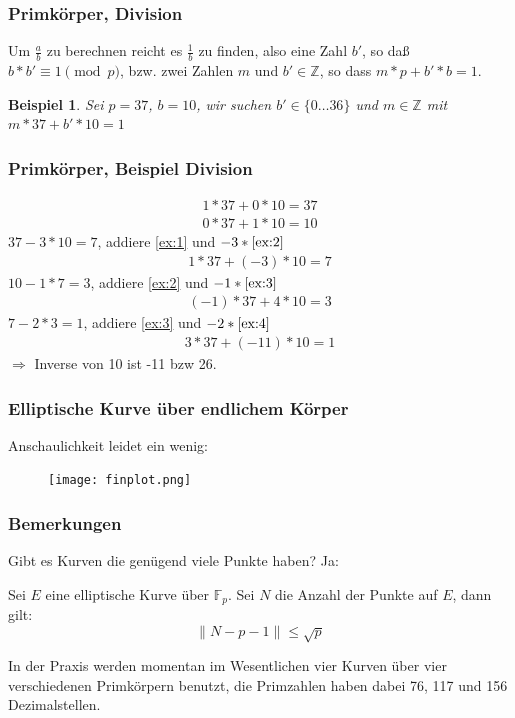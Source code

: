 \documentclass{beamer}
\newcommand{\F}{\mathbb{F}}
\newcommand{\Z}{\mathbb{Z}}
\newtheorem{beispiel}[theorem]{Beispiel}
\begin{document}
\begin{frame}
  \frametitle{Primkörper, Division}
  Um $\frac{a}{b}$ zu berechnen reicht es $\frac 1 b$ zu finden, also eine Zahl
  $b'$, so daß $b * b' \equiv 1 \pmod p$, bzw. zwei Zahlen $m$ und
  $b' \in \Z$, so dass $m * p + b' * b = 1$.
  \begin{beispiel}
    Sei $p = 37$, $b = 10$, wir suchen $b' \in \{0 \ldots 36\}$ und
    $m \in \Z$ mit $m * 37 + b' * 10 = 1$
  \end{beispiel}
\end{frame}

\begin{frame}
  \frametitle{Primkörper, Beispiel Division}
  \vspace*{-1cm}
  \begin{eqnarray}
    1 * 37 + 0 * 10 = 37  \label{ex:1} \\
    0 * 37 + 1 * 10 = 10  \label{ex:2}
  \end{eqnarray}
  $37 - 3 * 10 = 7$, addiere \eqref{ex:1} und $-3 * \eqref{ex:2}$
  \begin{eqnarray}
    1 *37 + (-3) * 10 = 7 \label{ex:3}
  \end{eqnarray}
  $10 - 1 * 7 = 3$, addiere \eqref{ex:2} und $-1 * \eqref{ex:3}$
  \begin{eqnarray}
    (-1) * 37 + 4 * 10 = 3 \label{ex:4}
  \end{eqnarray}
  $7 - 2*3 = 1$, addiere \eqref{ex:3} und $-2 * \eqref{ex:4}$
  \begin{eqnarray}
    3 * 37 + (-11) * 10 = 1
  \end{eqnarray}
  $\Rightarrow$ Inverse von 10 ist -11 bzw 26.
\end{frame}

\begin{frame}
  \frametitle{Elliptische Kurve über endlichem Körper}
  Anschaulichkeit leidet ein wenig:
  \begin{figure}
    \texttt{[image: finplot.png]}
  \end{figure}
\end{frame}
\begin{frame}
  \frametitle{Bemerkungen}
  Gibt es Kurven die genügend viele Punkte haben? Ja:
  \begin{theorem}
    Sei $E$ eine elliptische Kurve über $\F_p$. Sei $N$ die Anzahl der Punkte
    auf $E$, dann gilt:
    \begin{equation}
      \| N - p - 1 \| \le \sqrt{p}
    \end{equation}
  \end{theorem}
  In der Praxis werden momentan im Wesentlichen vier Kurven über vier
  verschiedenen Primkörpern benutzt, die Primzahlen haben dabei 76, 117 und
  156 Dezimalstellen.
\end{frame}
\end{document}
